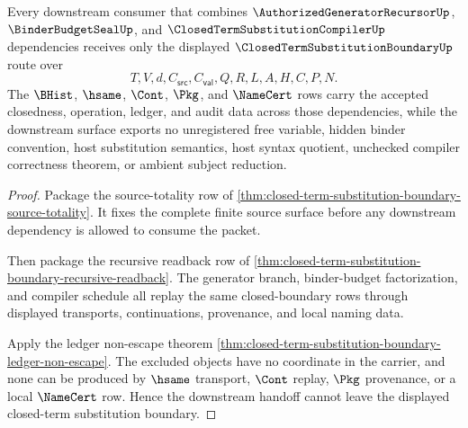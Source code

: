 \begin{theorem}
\label{thm:closed-term-substitution-boundary-downstream-nonescape}
Every downstream consumer that combines $\AuthorizedGeneratorRecursorUp$, $\BinderBudgetSealUp$, and $\ClosedTermSubstitutionCompilerUp$ dependencies receives only the displayed $\ClosedTermSubstitutionBoundaryUp$ route over
$$
T,V,d,C_{\mathsf{src}},C_{\mathsf{val}},Q,R,L,A,H,C,P,N.
$$
The $\BHist$, $\hsame$, $\Cont$, $\Pkg$, and $\NameCert$ rows carry the accepted closedness, operation, ledger, and audit data across those dependencies, while the downstream surface exports no unregistered free variable, hidden binder convention, host substitution semantics, host syntax quotient, unchecked compiler correctness theorem, or ambient subject reduction.
\end{theorem}
\begin{proof}
Package the source-totality row of \autoref{thm:closed-term-substitution-boundary-source-totality}. It fixes the complete finite source surface before any downstream dependency is allowed to consume the packet.

Then package the recursive readback row of \autoref{thm:closed-term-substitution-boundary-recursive-readback}. The generator branch, binder-budget factorization, and compiler schedule all replay the same closed-boundary rows through displayed transports, continuations, provenance, and local naming data.

Apply the ledger non-escape theorem \autoref{thm:closed-term-substitution-boundary-ledger-non-escape}. The excluded objects have no coordinate in the carrier, and none can be produced by $\hsame$ transport, $\Cont$ replay, $\Pkg$ provenance, or a local $\NameCert$ row. Hence the downstream handoff cannot leave the displayed closed-term substitution boundary.
\end{proof}

